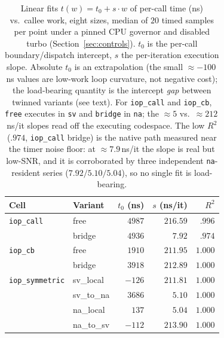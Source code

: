 \documentclass[conference]{IEEEtran}
\newcommand{\code}[1]{\texttt{#1}}
\begin{document}
\begin{table}[t]
\caption{Linear fits $t(w)=t_0+s\cdot w$ of per-call time (ns) vs.\ callee work,
eight sizes, median of $20$ timed samples per point under a pinned CPU governor
and disabled turbo (Section~\ref{sec:controls}). $t_0$ is the per-call
boundary/dispatch intercept, $s$ the per-iteration execution slope. Absolute
$t_0$ is an extrapolation (the small $\approx$$-100$\,ns values are low-work
loop curvature, not negative cost); the load-bearing quantity is the intercept
\emph{gap} between twinned variants (see text). For \code{iop\_call} and
\code{iop\_cb}, \code{free} executes in \code{sv} and \code{bridge} in
\code{na}; the $\approx$$5$ vs.\ $\approx$$212$\,ns/it slopes read off the
executing codespace. The low $R^2$ ($.974$, \code{iop\_call} bridge) is the
native path measured near the timer noise floor: at $\approx$$7.9$\,ns/it the
slope is real but low-SNR, and it is corroborated by three independent
\code{na}-resident series ($7.92/5.10/5.04$), so no single fit is load-bearing.}
\label{tab:fits}
\centering
\footnotesize
\setlength{\tabcolsep}{4pt}
\begin{tabular}{@{}llrrr@{}}
\toprule
Cell & Variant & $t_0$ (ns) & $s$ (ns/it) & $R^2$ \\
\midrule
\code{iop\_call} & free    & $4987$ & $216.59$ & $.996$  \\
                 & bridge  & $4936$ & $7.92$   & $.974$  \\
\midrule
\code{iop\_cb}   & free    & $1910$ & $211.95$ & $1.000$ \\
                 & bridge  & $3918$ & $212.89$ & $1.000$ \\
\midrule
\code{iop\_symmetric} & sv\_local  & $-126$  & $211.81$ & $1.000$ \\
                      & sv\_to\_na & $3686$  & $5.10$   & $1.000$ \\
                      & na\_local  & $137$   & $5.04$   & $1.000$ \\
                      & na\_to\_sv & $-112$  & $213.90$ & $1.000$ \\
\bottomrule
\end{tabular}
\end{table}
\end{document}
